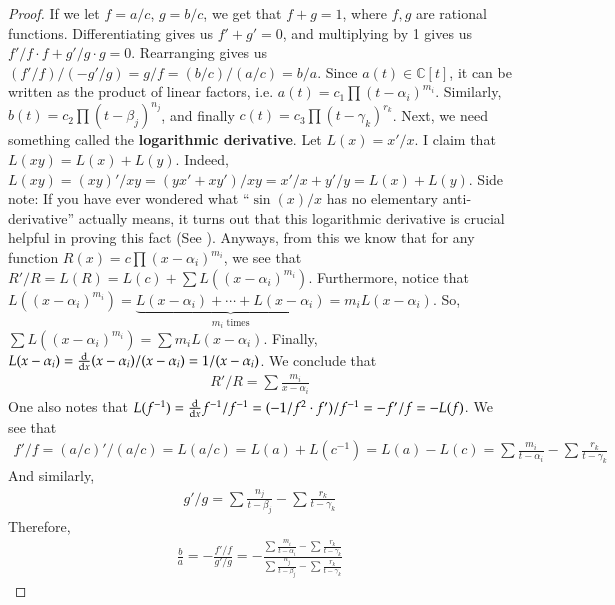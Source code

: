 \documentclass[12pt]{article}
\theoremstyle{definitionstyle}
\def\mbb#1{\mathbb{#1}}
\def \C{\mbb{C}}
\begin{document}
\begin{proof} \cite{lang2005algebra}
	If we let $f = a/c$, $g = b/c$, we get that $f + g = 1$, where $f, g$ are rational functions. Differentiating gives us $f' + g' = 0$, and multiplying by 1 gives us $f'/f \cdot f + g'/g \cdot g = 0$. Rearranging gives us $(f'/f) / (-g'/g) =  g/f = (b/c)/(a/c) = b/a$. Since $a(t) \in \C[t]$, it can be written as the product of linear factors, i.e. $a(t) = c_1 \prod (t-\alpha_i)^{m_i}$. Similarly, $b(t)=c_2\prod (t-\beta_j)^{n_j}$, and finally $c(t) = c_3\prod (t-\gamma_k)^{r_k}$. Next, we need something called the \textbf{logarithmic derivative}. Let $L(x) = x'/x$. I claim that $L(xy) = L(x) + L(y)$. Indeed, $L(xy) = (xy)'/xy = (yx' + xy')/xy = x'/x + y'/y = L(x) + L(y)$. Side note: If you have ever wondered what ``$\sin(x)/x$ has no elementary anti-derivative'' actually means, it turns out that this logarithmic derivative is crucial helpful in proving this fact (See \cite{enwiki:1147605007}). Anyways, from this we know that for any function $R(x) = c\prod (x-\alpha_i)^{m_i}$, we see that $R'/R = L(R) = L(c) + \sum L((x-\alpha_i)^{m_i})$. Furthermore, notice that $L((x-\alpha_i)^{m_i}) = \underbrace{L(x-\alpha_i) + \cdots + L(x-\alpha_i)}_{\text{$m_i$ times}} = m_iL(x-\alpha_i)$. So, $\sum L((x-\alpha_i)^{m_i}) = \sum {m_i}L(x-\alpha_i)$. Finally, $L(x-\alpha_i) = \dv{x} (x-\alpha_i)/(x-\alpha_i) = 1/(x-\alpha_i)$. We conclude that \begin{align*}
		R'/R = \sum \frac{m_i}{x-\alpha_i}
	\end{align*}
	One also notes that $L(f^{-1}) = \dv{x} f^{-1}/f^{-1} = (-1/f^2 \cdot f') / f^{-1} = -f'/f = -L(f)$. We see that \begin{align*}
		f'/f = (a/c)'/(a/c) = L(a/c) = L(a) + L(c^{-1}) = L(a) - L(c) = \sum \frac{m_i}{t-\alpha_i} - \sum \frac{r_k}{t-\gamma_k}
	\end{align*}
	And similarly, 
	\begin{align*}
		g'/g = \sum \frac{n_j}{t-\beta_j} - \sum \frac{r_k}{t-\gamma_k}
	\end{align*}
	Therefore,
	\begin{align*}
		\frac{b}{a} = -\frac{f'/f}{g'/g} = -\frac{\sum \frac{m_i}{t-\alpha_i} - \sum \frac{r_k}{t-\gamma_k}}{\sum \frac{n_j}{t-\beta_j} - \sum \frac{r_k}{t-\gamma_k}}
	\end{align*}

\end{proof}
\end{document}

